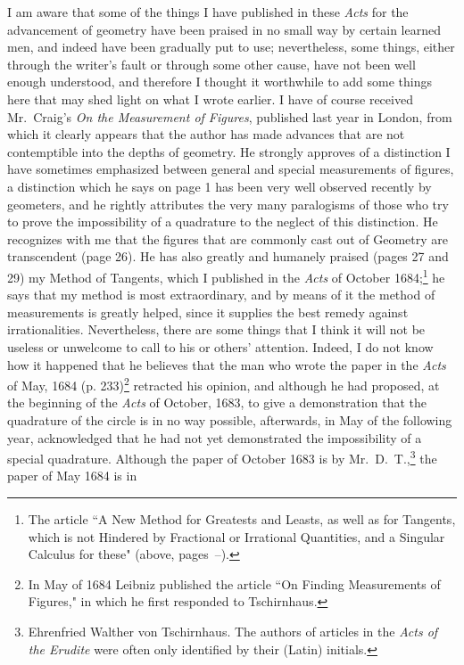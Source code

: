\documentclass[polutonikogreek,english,twoside,openright]{article}
\begin{document}
I am aware that some of the things I have published in these {\em
  Acts} for the advancement of geometry have been praised in no small
way by certain learned men, and indeed have been gradually put to use;
nevertheless, some things, either through the writer's fault or
through some other cause, have not been well enough understood, and
therefore I thought it worthwhile to add some things here that may
shed light on what I wrote earlier.  I have of course received Mr.\
Craig's {\em On the Measurement of Figures}, published last year in
London, from which it clearly appears that the author has made
advances that are not contemptible into the depths of geometry.  He
strongly approves of a distinction I have sometimes emphasized between
general and special measurements of figures, a distinction which he
says on page 1 has been very well observed recently by geometers, and
he rightly attributes the very many paralogisms of those who try to
prove the impossibility of a quadrature to the neglect of
this distinction.  He recognizes
with me that the figures that are commonly cast out of Geometry are
transcendent (page 26).\marginnote{Note 3, p.~\pageref{crg3}} He has
also greatly and humanely praised (pages 27 and 29) my Method of
Tangents, which I published in the {\em Acts} of October
1684;\footnote{The article ``A New Method for Greatests and Leasts, as
  well as for Tangents, which is not Hindered by Fractional or
  Irrational Quantities, and a Singular Calculus for these" (above,
  pages~\pageref{begnm}--\pageref{endnm}).}  he says that my method is
most extraordinary, and by means of it the method of measurements is
greatly helped, since it supplies the best remedy against
irrationalities. Nevertheless,
there are some things that I think it will not be useless or unwelcome
to call to his or others' attention.  Indeed, I do not know how it
happened that he believes that the man who wrote the paper in the {\em
  Acts} of May, 1684 (p. 233)\footnote{In May of 1684 Leibniz
  published the article ``On Finding Measurements of Figures," in
  which he first responded to Tschirnhaus.} retracted his opinion, and
although he had proposed, at the beginning of the {\em Acts} of
October, 1683, to give a demonstration that the quadrature of the
circle is in no way possible, afterwards, in May of the following
year, acknowledged that he had not yet demonstrated the impossibility
of a special quadrature.  Although the paper of October 1683 is by
Mr.\ D.\ T.,\footnote{Ehrenfried Walther von Tschirnhaus. The authors
  of articles in the {\em Acts of the Erudite} were often only
  identified by their (Latin) initials.} the paper of May 1684 is in
\end{document}
